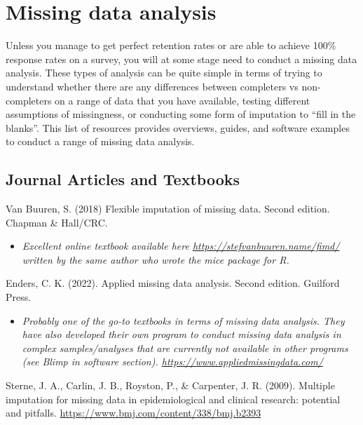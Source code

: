 \documentclass[
]{book}
\providecommand{\tightlist}{%
  \setlength{\itemsep}{0pt}\setlength{\parskip}{0pt}}
\begin{document}
\hypertarget{missing-data-analysis}{%
\chapter{Missing data analysis}\label{missing-data-analysis}}

Unless you manage to get perfect retention rates or are able to achieve 100\% response rates on a survey, you will at some stage need to conduct a missing data analysis. These types of analysis can be quite simple in terms of trying to understand whether there are any differences between completers vs non-completers on a range of data that you have available, testing different assumptions of missingness, or conducting some form of imputation to ``fill in the blanks''. This list of resources provides overviews, guides, and software examples to conduct a range of missing data analysis.

\hypertarget{journal-articles-and-textbooks-5}{%
\section{Journal Articles and Textbooks}\label{journal-articles-and-textbooks-5}}

Van Buuren, S. (2018) Flexible imputation of missing data. Second edition. Chapman \& Hall/CRC.

\begin{itemize}
\tightlist
\item
  \emph{Excellent online textbook available here \url{https://stefvanbuuren.name/fimd/} written by the same author who wrote the mice package for R. }
\end{itemize}

Enders, C. K. (2022). Applied missing data analysis. Second edition. Guilford Press.

\begin{itemize}
\tightlist
\item
  \emph{Probably one of the go-to textbooks in terms of missing data analysis. They have also developed their own program to conduct missing data analysis in complex samples/analyses that are currently not available in other programs (see Blimp in software section). \url{https://www.appliedmissingdata.com/} }
\end{itemize}

Sterne, J. A., Carlin, J. B., Royston, P., \& Carpenter, J. R. (2009). Multiple imputation for missing data in epidemiological and clinical research: potential and pitfalls. \url{https://www.bmj.com/content/338/bmj.b2393}
\end{document}
